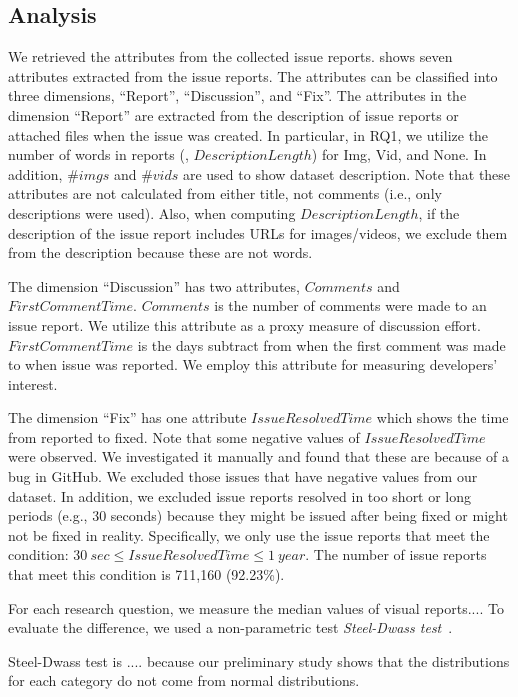 % 
%

\subsection{Analysis}
We retrieved the attributes from the collected issue reports.
 shows seven attributes extracted from 
the issue reports. 
The attributes can be classified into three dimensions, 
``Report'', ``Discussion'', and ``Fix''. 
The attributes in the dimension ``Report'' are extracted from 
the description of issue reports or attached files 
when the issue was created. 
In particular, in RQ1, we 
utilize the number of words 
in reports (\ie, $DescriptionLength$) for Img, Vid, and None. 
In addition,  $\#imgs$ and $\#vids$ are used to show 
dataset description. 
Note that these attributes are not calculated from either title, not comments (i.e., only descriptions were used). 
Also, when computing $DescriptionLength$, if the description of the issue report 
includes URLs for images/videos, 
we exclude them from the description because these are not words.

The dimension ``Discussion'' has two attributes, $Comments$ and $FirstCommentTime$. $Comments$ is the number of comments were made to an issue report. We utilize this attribute as a proxy measure of discussion effort. $FirstCommentTime$ is the days subtract from when the first comment was made to when issue was reported. We employ this attribute for measuring developers' interest. 

The dimension ``Fix'' has one attribute $IssueResolvedTime$ which shows the time from reported to fixed. 
Note that some negative values of $IssueResolvedTime$ were observed. We investigated it manually and found that these are because of a bug in GitHub.  We excluded those issues that have negative values from our dataset. 
In addition, we excluded issue reports resolved in too short or long periods (e.g., 30 seconds) because they might be issued after being fixed or might not be fixed in reality.
Specifically, we only use the issue reports that meet the condition: $30\ sec \leq IssueResolvedTime \leq 1\ year$.
The number of issue reports that meet this condition is 711,160 (92.23\%).


For each research question, we measure the median values of visual reports.... 
To evaluate the difference, we used a non-parametric test \textit{Steel-Dwass test}~\citep{steel-dwass-test}.

 Steel-Dwass test is ....
because our preliminary study shows that 
the distributions for each category do not 
come from normal distributions. 
